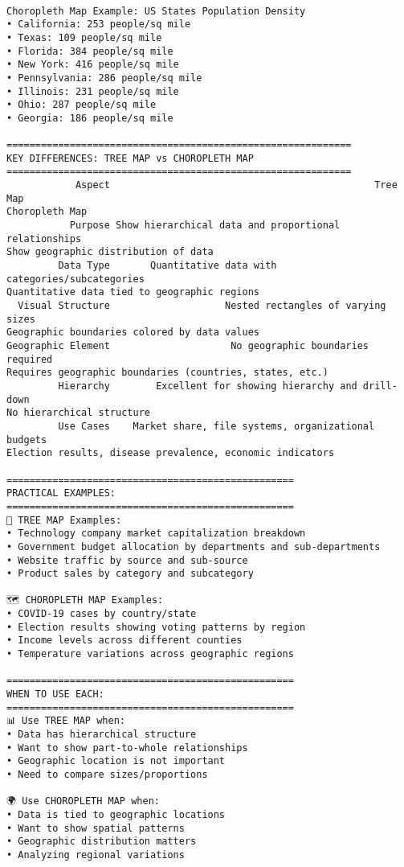 \documentclass[11pt]{article}
\begin{document}
    \begin{center}
    \end{center}
    { \hspace*{\fill} \\}

    \begin{Verbatim}[commandchars=\\\{\}]
Choropleth Map Example: US States Population Density
• California: 253 people/sq mile
• Texas: 109 people/sq mile
• Florida: 384 people/sq mile
• New York: 416 people/sq mile
• Pennsylvania: 286 people/sq mile
• Illinois: 231 people/sq mile
• Ohio: 287 people/sq mile
• Georgia: 186 people/sq mile

============================================================
KEY DIFFERENCES: TREE MAP vs CHOROPLETH MAP
============================================================
            Aspect                                              Tree Map
Choropleth Map
           Purpose Show hierarchical data and proportional relationships
Show geographic distribution of data
         Data Type       Quantitative data with categories/subcategories
Quantitative data tied to geographic regions
  Visual Structure                    Nested rectangles of varying sizes
Geographic boundaries colored by data values
Geographic Element                     No geographic boundaries required
Requires geographic boundaries (countries, states, etc.)
         Hierarchy        Excellent for showing hierarchy and drill-down
No hierarchical structure
         Use Cases    Market share, file systems, organizational budgets
Election results, disease prevalence, economic indicators

==================================================
PRACTICAL EXAMPLES:
==================================================
🔲 TREE MAP Examples:
• Technology company market capitalization breakdown
• Government budget allocation by departments and sub-departments
• Website traffic by source and sub-source
• Product sales by category and subcategory

🗺️ CHOROPLETH MAP Examples:
• COVID-19 cases by country/state
• Election results showing voting patterns by region
• Income levels across different counties
• Temperature variations across geographic regions

==================================================
WHEN TO USE EACH:
==================================================
📊 Use TREE MAP when:
• Data has hierarchical structure
• Want to show part-to-whole relationships
• Geographic location is not important
• Need to compare sizes/proportions

🌍 Use CHOROPLETH MAP when:
• Data is tied to geographic locations
• Want to show spatial patterns
• Geographic distribution matters
• Analyzing regional variations
    \end{Verbatim}
\end{document}
